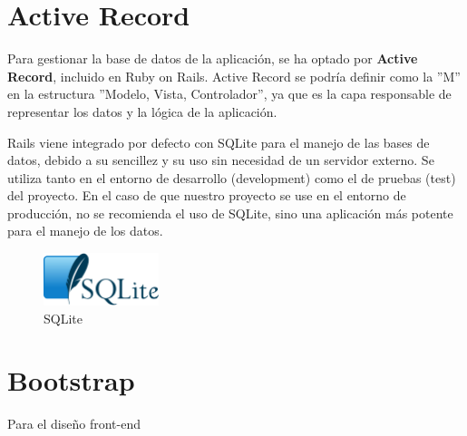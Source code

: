 \section{Active Record}
\label{3:sec:2}

Para gestionar la base de datos de la aplicación, se ha optado por \textbf{Active Record}\cite{Active}, incluido en Ruby on Rails. Active Record se podría definir como la ''M'' en la estructura ''Modelo, Vista, Controlador'', ya que es la capa responsable de representar los datos y la lógica de la aplicación.

Rails viene integrado por defecto con SQLite para el manejo de las bases de datos, debido a su sencillez y su uso sin necesidad de un servidor externo. Se utiliza tanto en el entorno de desarrollo (development) como el de pruebas (test) del proyecto. 
En el caso de que nuestro proyecto se use en el entorno de producción, no se recomienda el uso de SQLite, sino una aplicación más potente para el manejo de los datos.

\begin{figure}[!th]
\begin{center}
\includegraphics[width=0.3\textwidth]{images/logo_sqlite.eps}
\caption{SQLite}
\label{fig:5}
\end{center}
\end{figure}


\section{Bootstrap}
\label{3:sec:3}

Para el diseño front-end